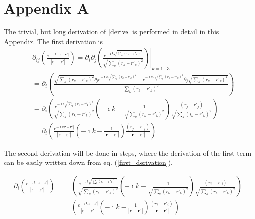 \documentclass[a4paper,11pt]{thesis}
\begin{document}
\chapter{\textbf{Appendix A}}
The trivial, but long derivation of \ref{derive} is performed in detail in this Appendix. The first derivation is
\begin{eqnarray}
 &&\partial_{ij} \left( \frac{e^{- \imath k \cdot | \mathbf{r}-\mathbf{r'} |}}{| \mathbf{r}-\mathbf{r'} |} \right)=   \partial_{i}  \partial_{j}  \left. \left( \frac{e^{- \imath k  \sqrt{\sum_k(r_k-r'_k)^2} }}{\sqrt{\sum_k(r_k-r'_k)^2}}\right) \right|_{k=1\dots 3}\nonumber\\
&& = \partial_{i} \left( \frac{\sqrt{\sum_k(r_k-r'_k)^2} \partial_{j}e^{- \imath k  \sqrt{\sum_k(r_k-r'_k)^2} }-e^{- \imath k \cdot \sqrt{\sum_k(r_k-r'_k)^2}} \partial_j \sqrt{\sum_k(r_k-r'_k)^2}}{\sum_k(r_k-r'_k)^2}\right)\nonumber \\
&&= \partial_{i} \left( \frac{e^{- \imath k  \sqrt{\sum_k(r_k-r'_k)^2} }}{\sqrt{\sum_k(r_k-r'_k)^2}} \left( -\imath k- \frac{1}{\sqrt{\sum_k(r_k-r'_k)^2}}\right)\frac{(r_j-r'_j)}{\sqrt{\sum_k(r_k-r'_k)^2}}\right)\label{first_derivation}\\
&&= \partial_{i} \left( \frac{e^{- \imath k | \mathbf{r}-\mathbf{r'}|}}{| \mathbf{r}-\mathbf{r'}|} \left( -\imath k- \frac{1}{| \mathbf{r}-\mathbf{r'}|}\right)\frac{(r_j-r'_j)}{| \mathbf{r}-\mathbf{r'}|}\right)
 \end{eqnarray}


The second derivation will be done in steps, where the derivation of the first term can be easily written down from eq. (\ref{first_derivation}).


\begin{eqnarray}
 \partial_{i} \left( \frac{e^{- \imath k \cdot | \mathbf{r}-\mathbf{r'} |}}{| \mathbf{r}-\mathbf{r'} |} \right)&=&    \left( \frac{e^{- \imath k  \sqrt{\sum_k(r_k-r'_k)^2} }}{\sqrt{\sum_k(r_k-r'_k)^2}} \left( -\imath k- \frac{1}{\sqrt{\sum_k(r_k-r'_k)^2}}\right)\frac{(r_i-r'_i)}{\sqrt{\sum_k(r_k-r'_k)^2}}\right)\nonumber\\
&=&    \left( \frac{e^{- \imath k  | \mathbf{r}-\mathbf{r'}| }}{| \mathbf{r}-\mathbf{r'}|} \left( -\imath k- \frac{1}{| \mathbf{r}-\mathbf{r'}|}\right)\frac{(r_i-r'_i)}{| \mathbf{r}-\mathbf{r'}|}\right)
 \end{eqnarray}
\end{document}
